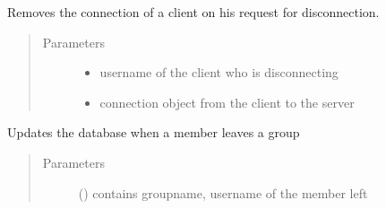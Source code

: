 \documentclass[letterpaper,10pt,english]{sphinxmanual}
\begin{document}

\begin{fulllineitems}
\label{\detokenize{server:server.disconnect}}
Removes the connection of a client on his request for disconnection.
\begin{quote}\begin{description}
\item[{Parameters}] \leavevmode\begin{itemize}
\item {} 
 \textendash{} username of the client who is disconnecting

\item {} 
 \textendash{} connection object from the client to the server

\end{itemize}

\end{description}\end{quote}

\end{fulllineitems}


\begin{fulllineitems}
\label{\detokenize{server:server.leave_group}}
Updates the database when a member leaves a group
\begin{quote}\begin{description}
\item[{Parameters}] \leavevmode
{} () \textendash{} contains groupname, username of the member left

\end{description}\end{quote}

\end{fulllineitems}

\end{document}
